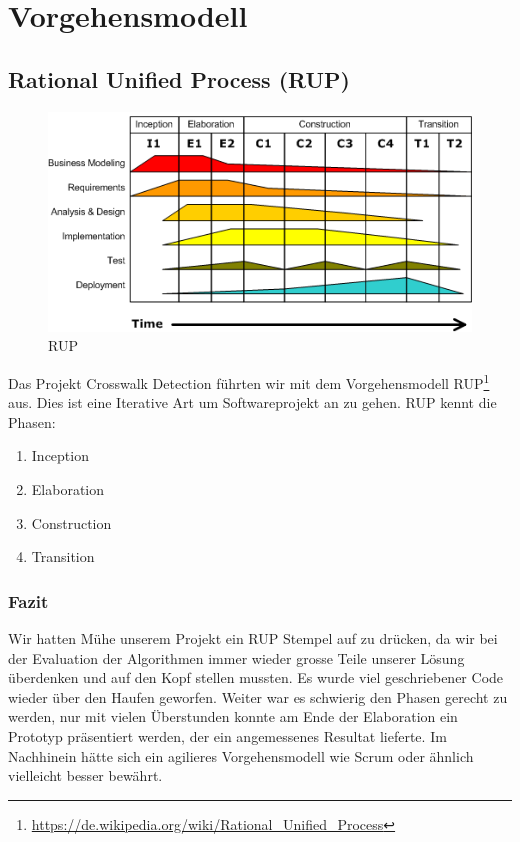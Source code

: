 \section{Vorgehensmodell}
\subsection{Rational Unified Process (RUP)}

\begin{figure}[H]
\centering
\includegraphics[width=\textwidth]{images/rup.png}
\caption[RUP]{RUP}
\end{figure}

Das Projekt Crosswalk Detection führten wir mit dem Vorgehensmodell RUP\footnote{\url{https://de.wikipedia.org/wiki/Rational_Unified_Process}} aus.
Dies ist eine Iterative Art um Softwareprojekt an zu gehen. RUP kennt die Phasen:

\begin{enumerate}
	\item Inception
	\item Elaboration
	\item Construction
	\item Transition
\end{enumerate}

\subsubsection{Fazit}
Wir hatten Mühe unserem Projekt ein RUP Stempel auf zu drücken, da wir bei der Evaluation der Algorithmen immer wieder grosse Teile unserer Lösung überdenken und auf den Kopf stellen mussten. Es wurde viel geschriebener Code wieder über den Haufen geworfen. Weiter war es schwierig den Phasen gerecht zu werden, nur mit vielen Überstunden konnte am Ende der Elaboration ein Prototyp präsentiert werden, der ein angemessenes Resultat lieferte. Im Nachhinein hätte sich ein agilieres Vorgehensmodell wie Scrum oder ähnlich vielleicht besser bewährt.
 

